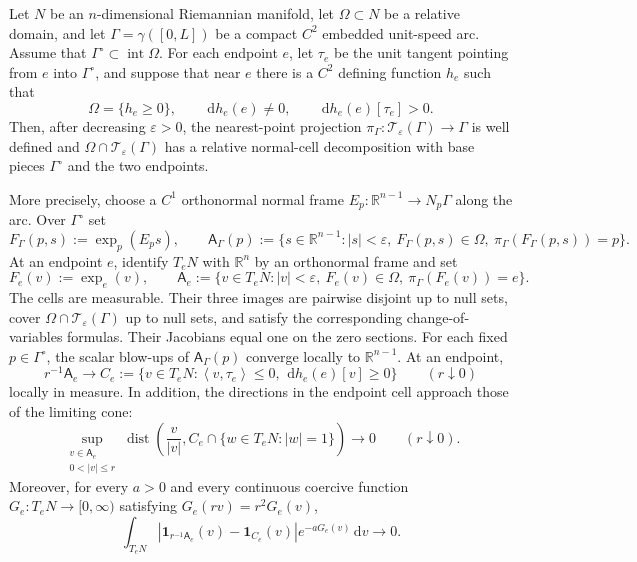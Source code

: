 \documentclass[10pt,a4paper]{amsart}
\DeclareMathOperator{\dist}{dist}
\newcommand{\Afib}{\mathsf{A}}
\newcommand{\R}{\mathbb{R}}
\newcommand{\cT}{\mathcal{T}}
\newcommand{\dd}{\,\mathrm{d}}
\newcommand{\eps}{\varepsilon}
\newcommand{\ind}{\mathbf{1}}
\newcommand{\inner}[2]{\left\langle #1,#2\right\rangle}
\begin{document}
\begin{lemma}
\label{lem:transverse-arc-normal-cells}
Let $N$ be an $n$-dimensional Riemannian manifold, let $\Omega\subset N$ be a
relative domain, and let $\Gamma=\gamma([0,L])$ be a compact $C^2$ embedded
unit-speed arc.  Assume that $\Gamma^\circ\subset\operatorname{int}\Omega$.
For each endpoint $e$, let $\tau_e$ be the unit tangent pointing from $e$ into
$\Gamma^\circ$, and suppose that near $e$ there is a $C^2$ defining function
$h_e$ such that
\[
 \Omega=\{h_e\ge0\},\qquad \dd h_e(e)\ne0,
 \qquad \dd h_e(e)[\tau_e]>0.
\]
Then, after decreasing $\eps>0$, the nearest-point projection
$\pi_\Gamma:\cT_\eps(\Gamma)\to\Gamma$ is well defined and
$\Omega\cap\cT_\eps(\Gamma)$ has a relative normal-cell decomposition with
base pieces $\Gamma^\circ$ and the two endpoints.

More precisely, choose a $C^1$ orthonormal normal frame
$E_p:\R^{n-1}\to N_p\Gamma$ along the arc.  Over $\Gamma^\circ$ set
\[
 F_\Gamma(p,s):=\exp_p(E_p s),\qquad
 \Afib_\Gamma(p):=
 \{s\in\R^{n-1}:|s|<\eps,\ F_\Gamma(p,s)\in\Omega,\
                    \pi_\Gamma(F_\Gamma(p,s))=p\}.
\]
At an endpoint $e$, identify $T_eN$ with $\R^n$ by an orthonormal frame and set
\[
 F_e(v):=\exp_e(v),\qquad
 \Afib_e:=\{v\in T_eN:|v|<\eps,\ F_e(v)\in\Omega,\
                      \pi_\Gamma(F_e(v))=e\}.
\]
The cells are measurable.  Their three images are pairwise disjoint up to
null sets, cover $\Omega\cap\cT_\eps(\Gamma)$ up to null sets, and satisfy the
corresponding change-of-variables formulas.  Their Jacobians equal one on the
zero sections.
For each fixed $p\in\Gamma^\circ$, the scalar blow-ups of
$\Afib_\Gamma(p)$ converge locally to $\R^{n-1}$.  At an endpoint,
\begin{equation}\label{eq:transverse-arc-endpoint-cone}
 r^{-1}\Afib_e\longrightarrow
 C_e:=\{v\in T_eN:\inner{v}{\tau_e}\le0,\
                 \dd h_e(e)[v]\ge0\}
 \qquad(r\downarrow0)
\end{equation}
locally in measure.  In addition, the directions in the endpoint cell approach
those of the limiting cone:
\begin{equation}\label{eq:transverse-arc-directional-convergence}
 \sup_{\substack{v\in\Afib_e\\0<|v|\le r}}
 \dist\!\left(\frac{v}{|v|},
 C_e\cap\{w\in T_eN:|w|=1\}\right)\longrightarrow0
 \qquad(r\downarrow0).
\end{equation}
Moreover, for every $a>0$ and every continuous coercive function
$G_e:T_eN\to[0,\infty)$ satisfying $G_e(rv)=r^2G_e(v)$,
\begin{equation}\label{eq:transverse-arc-weighted-cell-limit}
 \int_{T_eN}
 \left|\ind_{r^{-1}\Afib_e}(v)-\ind_{C_e}(v)\right|
 e^{-aG_e(v)}\dd v\longrightarrow0.
\end{equation}
\end{lemma}
\end{document}
